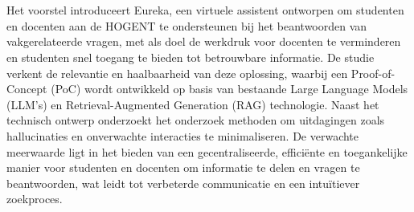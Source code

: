 
%
%
%
%
%

%



\chapter*{}

Het voorstel introduceert Eureka, een virtuele assistent ontworpen om studenten en docenten aan de HOGENT te ondersteunen bij het beantwoorden van vakgerelateerde vragen, met als doel de werkdruk voor docenten te verminderen en studenten snel toegang te bieden tot betrouwbare informatie. De studie verkent de relevantie en haalbaarheid van deze oplossing, waarbij een Proof-of-Concept (PoC) wordt ontwikkeld op basis van bestaande Large Language Models (LLM’s) en Retrieval-Augmented Generation (RAG) technologie. Naast het technisch ontwerp onderzoekt het onderzoek methoden om uitdagingen zoals hallucinaties en onverwachte interacties te minimaliseren. De verwachte meerwaarde ligt in het bieden van een gecentraliseerde, efficiënte en toegankelijke manier voor studenten en docenten om informatie te delen en vragen te beantwoorden, wat leidt tot verbeterde communicatie en een intuïtiever zoekproces.

